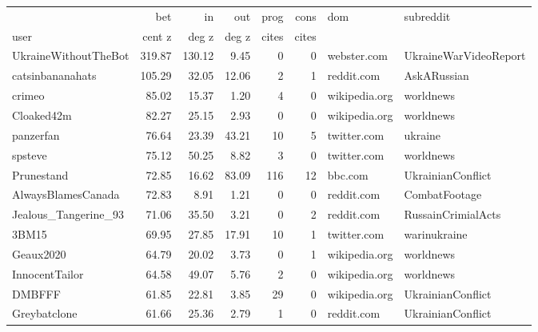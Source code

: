 \begin{tabular}{lrrrrrll}
\toprule
{}   & bet    & in    & out   & prog  & cons  & dom & subreddit \\
user & cent z & deg z & deg z & cites & cites &      &          \\
\midrule
UkraineWithoutTheBot &      319.87 &    130.12 &       9.45 &           0 &           0 &    webster.com &  UkraineWarVideoReport \\
catsinbananahats     &      105.29 &     32.05 &      12.06 &           2 &           1 &     reddit.com &            AskARussian \\
crimeo               &       85.02 &     15.37 &       1.20 &           4 &           0 &  wikipedia.org &              worldnews \\
Cloaked42m           &       82.27 &     25.15 &       2.93 &           0 &           0 &  wikipedia.org &              worldnews \\
panzerfan            &       76.64 &     23.39 &      43.21 &          10 &           5 &    twitter.com &                ukraine \\
spsteve              &       75.12 &     50.25 &       8.82 &           3 &           0 &    twitter.com &              worldnews \\
Prunestand           &       72.85 &     16.62 &      83.09 &         116 &          12 &        bbc.com &      UkrainianConflict \\
AlwaysBlamesCanada   &       72.83 &      8.91 &       1.21 &           0 &           0 &     reddit.com &          CombatFootage \\
Jealous\_Tangerine\_93 &       71.06 &     35.50 &       3.21 &           0 &           2 &     reddit.com &     RussainCrimialActs \\
3BM15                &       69.95 &     27.85 &      17.91 &          10 &           1 &    twitter.com &           warinukraine \\
Geaux2020            &       64.79 &     20.02 &       3.73 &           0 &           1 &  wikipedia.org &              worldnews \\
InnocentTailor       &       64.58 &     49.07 &       5.76 &           2 &           0 &  wikipedia.org &              worldnews \\
DMBFFF               &       61.85 &     22.81 &       3.85 &          29 &           0 &  wikipedia.org &      UkrainianConflict \\
Greybatclone         &       61.66 &     25.36 &       2.79 &           1 &           0 &     reddit.com &      UkrainianConflict \\

\end{tabular}
